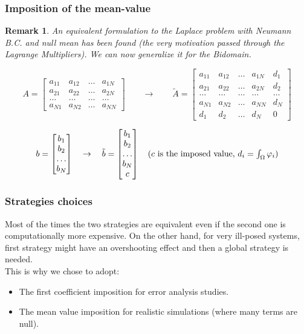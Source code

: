 \documentclass[9pt]{beamer}
\newtheorem*{remark}{Remark}
\begin{document}
\begin{frame}
\frametitle{Imposition of the mean-value}
\begin{remark}
	An equivalent formulation to the Laplace problem with Neumann B.C. and null mean has been found (the very motivation passed through the Lagrange Multipliers). We can now generalize it for the Bidomain.
\end{remark}
\begin{equation*}
A=\begin{bmatrix}
a_{11} & a_{12} & \dots & a_{1N} \\ 
a_{21} & a_{22} & \dots & a_{2N} \\ 
\dots & \dots & \dots & \dots \\
a_{N1}  & a_{N2} & \dots & a_{NN}
\end{bmatrix} \quad \quad \rightarrow
\quad \quad \tilde{A}=\begin{bmatrix}
a_{11} & a_{12} & \dots & a_{1N} & d_1\\ 
a_{21} & a_{22} & \dots & a_{2N} & d_2 \\ 
\dots & \dots & \dots & \dots & \dots \\
a_{N1}  & a_{N2} & \dots & a_{NN} & d_N \\
d_1 & d_2 & \dots & d_N & 0
\end{bmatrix}
\end{equation*}

\begin{equation*}
b=\begin{bmatrix}
b_1 \\ b_2 \\ \dots \\ b_N
\end{bmatrix} \quad \rightarrow \quad
\tilde{b}=\begin{bmatrix}
b_1 \\ b_2 \\ \dots \\ b_N \\ c
\end{bmatrix} \quad \text{($c$ is the imposed value, $ \textstyle d_i = \int_\Omega \varphi_i$)}
\end{equation*}
\end{frame}

\begin{frame}
\frametitle{Strategies choices}
Most of the times the two strategies are equivalent even if the second one is computationally more expensive. On the other hand, for very ill-posed systems, first strategy might have an overshooting effect and then a global strategy is needed. \vspace{4mm} \\
This is why we chose to adopt:
\begin{itemize}
	\item The first coefficient imposition for error analysis studies.
	\item The mean value imposition for realistic simulations (where many terms are null).
\end{itemize}
\end{frame}
\end{document}
